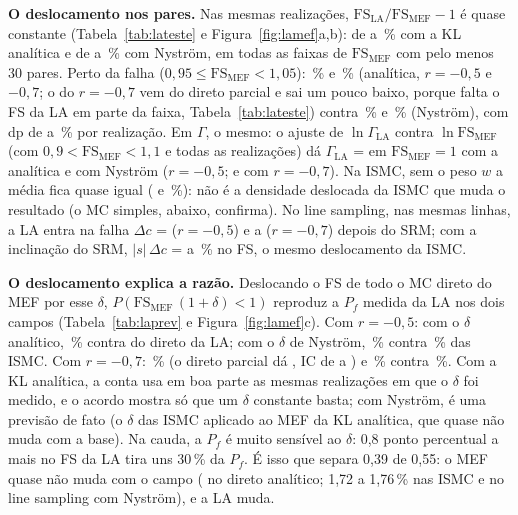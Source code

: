 \documentclass[11pt,a4paper]{article}
\begin{document}
\textbf{O deslocamento nos pares.} Nas mesmas realizações, $\mathrm{FS}_\text{LA}/\mathrm{FS}_\text{MEF} - 1$ é
quase constante (Tabela~\ref{tab:lateste} e Figura~\ref{fig:lamef}a,b): de \lmBandaAnMin{} a \lmBandaAnMax\,\% com a
KL analítica e de \lmBandaNyMin{} a \lmBandaNyMax\,\% com Nyström, em todas as faixas de $\mathrm{FS}_\text{MEF}$ com
pelo menos 30 pares. Perto da falha ($0{,}95 \le \mathrm{FS}_\text{MEF} < 1{,}05$): \lmDesAnRa\,\% e \lmDesAnRb\,\%
(analítica, $r = -0{,}5$ e $-0{,}7$; o do $r = -0{,}7$ vem do direto parcial e sai um pouco baixo, porque falta o FS
da LA em parte da faixa, Tabela~\ref{tab:lateste}) contra \lmDesNyRa\,\% e \lmDesNyRb\,\% (Nyström), com dp de
\lmDesNyRbDp{} a \lmDesAnRaDp\,\% por realização. Em $\Gamma$, o mesmo: o ajuste de $\ln\Gamma_\text{LA}$ contra $\ln\mathrm{FS}_\text{MEF}$ (com
$0{,}9 < \mathrm{FS}_\text{MEF} < 1{,}1$ e todas as realizações) dá $\Gamma_\text{LA}$ = \lmGumAnRa{} em
$\mathrm{FS}_\text{MEF} = 1$ com a analítica e \lmGumNyRa{} com Nyström ($r = -0{,}5$; \lmGumAnRb{} e \lmGumNyRb{} com
$r = -0{,}7$). Na ISMC, sem o peso $w$ a média fica quase igual (\lmDesNyRaSp{} e
\lmDesNyRbSp\,\%): não é a densidade deslocada da ISMC que muda o resultado (o MC simples, abaixo, confirma). No line
sampling, nas mesmas linhas, a LA
entra na falha $\Delta c$ =
\lmLsDcRaMin{} ($r = -0{,}5$) e \lmLsDcRbMin{} a \lmLsDcRbMax{} ($r = -0{,}7$) depois do SRM; com a inclinação do SRM,
$|s|\,\Delta c$ = \lmLsDfsRaMin{} a \lmLsDfsRbMax\,\% no FS, o mesmo deslocamento da ISMC.

\textbf{O deslocamento explica a razão.} Deslocando o FS de todo o MC direto do MEF por esse $\delta$,
$P(\mathrm{FS}_\text{MEF}\,(1 + \delta) < 1)$ reproduz a $P_f$ medida da LA nos dois campos (Tabela~\ref{tab:laprev} e
Figura~\ref{fig:lamef}c). Com $r = -0{,}5$: com o $\delta$ analítico, \lmPrevAnRa\,\% contra \lmDirRaPf{} do direto da
LA; com o $\delta$ de Nyström, \lmPrevNyRa\,\% contra \lmObsNyRa\,\% das ISMC. Com $r = -0{,}7$: \lmPrevAnRb\,\% (o
direto parcial dá \lmDirRbPf, IC de \lmDirRbLo{} a \lmDirRbHi) e \lmPrevNyRb\,\% contra \lmObsNyRb\,\%. Com a KL
analítica, a conta usa em boa parte as mesmas realizações em que o $\delta$ foi medido, e o acordo mostra só que um
$\delta$ constante basta; com Nyström, é uma previsão de fato (o $\delta$ das ISMC aplicado ao MEF da KL analítica,
que quase não muda com a base). Na cauda, a
$P_f$ é muito sensível ao $\delta$: 0,8 ponto percentual a mais no FS da LA tira uns 30\,\% da $P_f$. É isso que separa
0,39 de 0,55: o MEF quase não muda com o campo ( no direto analítico; 1,72 a 1,76\,\% nas ISMC e no line
sampling com Nyström), e a LA muda.
\end{document}
